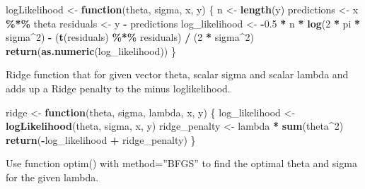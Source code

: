 \documentclass[
]{article}
\newenvironment{Shaded}{\begin{snugshade}}{\end{snugshade}}
\newcommand{\ControlFlowTok}[1]{\textcolor[rgb]{0.13,0.29,0.53}{\textbf{#1}}}
\newcommand{\DecValTok}[1]{\textcolor[rgb]{0.00,0.00,0.81}{#1}}
\newcommand{\FloatTok}[1]{\textcolor[rgb]{0.00,0.00,0.81}{#1}}
\newcommand{\FunctionTok}[1]{\textcolor[rgb]{0.13,0.29,0.53}{\textbf{#1}}}
\newcommand{\NormalTok}[1]{#1}
\newcommand{\OtherTok}[1]{\textcolor[rgb]{0.56,0.35,0.01}{#1}}
\newcommand{\SpecialCharTok}[1]{\textcolor[rgb]{0.81,0.36,0.00}{\textbf{#1}}}
\begin{document}
\begin{Shaded}
\begin{Highlighting}[]
\NormalTok{logLikelihood }\OtherTok{\textless{}{-}} \ControlFlowTok{function}\NormalTok{(theta, sigma, x, y) \{}
\NormalTok{  n }\OtherTok{\textless{}{-}} \FunctionTok{length}\NormalTok{(y)}
\NormalTok{  predictions }\OtherTok{\textless{}{-}}\NormalTok{ x }\SpecialCharTok{\%*\%}\NormalTok{ theta}
\NormalTok{  residuals }\OtherTok{\textless{}{-}}\NormalTok{ y }\SpecialCharTok{{-}}\NormalTok{ predictions}
\NormalTok{  log\_likelihood }\OtherTok{\textless{}{-}} \SpecialCharTok{{-}}\FloatTok{0.5} \SpecialCharTok{*}\NormalTok{ n }\SpecialCharTok{*} \FunctionTok{log}\NormalTok{(}\DecValTok{2} \SpecialCharTok{*}\NormalTok{ pi }\SpecialCharTok{*}\NormalTok{ sigma}\SpecialCharTok{\^{}}\DecValTok{2}\NormalTok{) }\SpecialCharTok{{-}}\NormalTok{ (}\FunctionTok{t}\NormalTok{(residuals) }\SpecialCharTok{\%*\%}\NormalTok{ residuals) }\SpecialCharTok{/}\NormalTok{ (}\DecValTok{2} \SpecialCharTok{*}\NormalTok{ sigma}\SpecialCharTok{\^{}}\DecValTok{2}\NormalTok{)}
  \FunctionTok{return}\NormalTok{(}\FunctionTok{as.numeric}\NormalTok{(log\_likelihood))}
\NormalTok{\}}
\end{Highlighting}
\end{Shaded}

Ridge function that for given vector theta, scalar sigma and scalar
lambda and adds up a Ridge penalty to the minus loglikelihood.

\begin{Shaded}
\begin{Highlighting}[]
\NormalTok{ridge }\OtherTok{\textless{}{-}} \ControlFlowTok{function}\NormalTok{(theta, sigma, lambda, x, y) \{}
\NormalTok{  log\_likelihood }\OtherTok{\textless{}{-}} \FunctionTok{logLikelihood}\NormalTok{(theta, sigma, x, y)}
\NormalTok{  ridge\_penalty }\OtherTok{\textless{}{-}}\NormalTok{ lambda }\SpecialCharTok{*} \FunctionTok{sum}\NormalTok{(theta}\SpecialCharTok{\^{}}\DecValTok{2}\NormalTok{)}
  \FunctionTok{return}\NormalTok{(}\SpecialCharTok{{-}}\NormalTok{log\_likelihood }\SpecialCharTok{+}\NormalTok{ ridge\_penalty)}
\NormalTok{\}}
\end{Highlighting}
\end{Shaded}

Use function optim() with method=''BFGS'' to find the optimal theta and
sigma for the given lambda.
\end{document}
